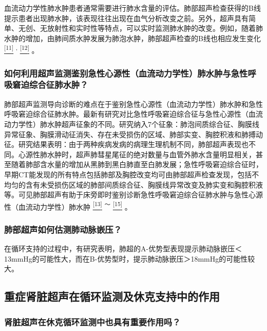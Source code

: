 血流动力学性肺水肿患者通常需要进行肺水含量的评估。肺部超声检查获得的B线提示患者出现肺水肿，该表现往往出现在血气分析改变之前。另外，超声具有简单、无创、无放射性和实时性等特点，可以实时监测肺水肿的改变。例如，随着肺水肿的增加，由肺间质水肿发展为肺泡水肿，肺部超声检查的B线也相应发生变化
\protect\hyperlink{text00009.htmlux5cux23ch11-8}{\textsuperscript{{[}11{]}}}
\textsuperscript{,}
\protect\hyperlink{text00009.htmlux5cux23ch12-8}{\textsuperscript{{[}12{]}}}
。

\subsubsection{如何利用超声监测鉴别急性心源性（血流动力学性）肺水肿与急性呼吸窘迫综合征肺水肿？}

肺部超声监测导向诊断的难点在于鉴别急性心源性（血流动力学性）肺水肿和急性呼吸窘迫综合征肺水肿。最新有研究对比急性呼吸窘迫综合征与急性心源性（血流动力学性）肺水肿超声征象的不同。研究纳入7个征象：肺泡间质综合征、胸膜线异常征象、胸膜滑动征消失、存在未受损伤的区域、肺部实变、胸腔积液和肺搏动征。研究结果表明：由于两种疾病发病的病理生理机制不同，肺部超声表现也不同。心源性肺水肿时，超声肺彗星尾征的绝对数量与血管外肺水含量明显相关，甚至随着肺部含水量的增加从黑肺到黑白肺直至白肺发展；急性呼吸窘迫综合征时，早期CT能发现的所有特点包括肺部及胸腔改变均可由肺部超声检查发现，包括不均匀的含有未受损伤区域的肺部间质综合征、胸膜线异常改变及肺实变和胸腔积液等。可见肺部超声有助于床旁即时鉴别诊断急性呼吸窘迫综合征肺水肿与急性心源性（血流动力学性）肺水肿
\protect\hyperlink{text00009.htmlux5cux23ch13-8}{\textsuperscript{{[}13{]}}}
\textsuperscript{～}
\protect\hyperlink{text00009.htmlux5cux23ch15-8}{\textsuperscript{{[}15{]}}}
。

\subsubsection{肺部超声如何估测肺动脉嵌压？}

在循环支持的过程中，有研究表明，肺超的A-优势型表现提示肺动脉嵌压＜13mmHg的可能性大，而在B-优势型时，提示肺动脉嵌压＞18mmHg的可能性较大。

\subsection{重症肾脏超声在循环监测及休克支持中的作用}

\subsubsection{肾脏超声在休克循环监测中也具有重要作用吗？}

